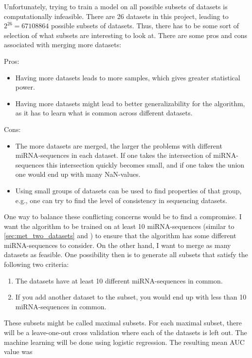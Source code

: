 {{{{{{{{Unfortunately, trying to train a model on all possible subsets of datasets is computationally infeasible. There are 26 datasets in this project, leading to $2^{26} = 67108864$ possible subsets of datasets. Thus, there has to be some sort of selection of what subsets are interesting to look at. There are some pros and cons associated with merging more datasets:

Pros:
\begin{itemize}
    \item Having more datasets leads to more samples, which gives greater statistical power.
    \item Having more datasets might lead to better generalizability for the algorithm, as it has to learn what is common across different datasets.
\end{itemize}

Cons:
\begin{itemize}
    \item The more datasets are merged, the larger the problems with different miRNA-sequences in each dataset. If one takes the intersection of miRNA-sequences this intersection quickly becomes small, and if one takes the union one would end up with many NaN-values.
    \item Using small groups of datasets can be used to find properties of that group, e.g., one can try to find the level of consistency in sequencing datasets.
\end{itemize}

One way to balance these conflicting concerns would be to find a compromise. I want the algorithm to be trained on at least 10 miRNA-sequences (similar to \autoref{sec:met_two_datasets} and \citet{forprosjekt}) to ensure that the algorithm has some different miRNA-sequences to consider. On the other hand, I want to merge as many datasets as feasible. One possibility then is to generate all subsets that satisfy the following two criteria:

\begin{enumerate}
    \item The datasets have at least 10 different miRNA-sequences in common.
    \item If you add another dataset to the subset, you would end up with less than 10 miRNA-sequences in common.
\end{enumerate}

These subsets might be called maximal subsets. For each maximal subset, there will be a leave-one-out cross validation where each of the datasets is left out. The machine learning will be done using logistic regression. The resulting mean AUC value was \py{"$%

}}}}}}}}}
